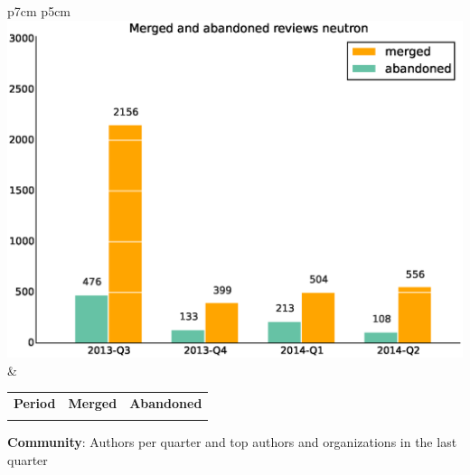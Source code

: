 \documentclass[a4wide,11pt]{report}
\begin{document}
\begin{tabular}{p{7cm} p{5cm}}
    \vspace{0pt} 
    \includegraphics[scale=.35]{figs/submitted_reviewsneutron.eps}
    & 
    \vspace{0pt}
    \begin{tabular}{l|r|r|}%
    \bfseries Period & \bfseries Merged & \bfseries Abandoned %
    \csvreader[head to column names]{data/submitted_reviewsneutron.csv}{}%
    {\\ & \merged & \abandoned}
    \end{tabular}
\end{tabular}


\textbf{Community}: Authors per quarter and top authors and organizations in the last quarter
\end{document}
